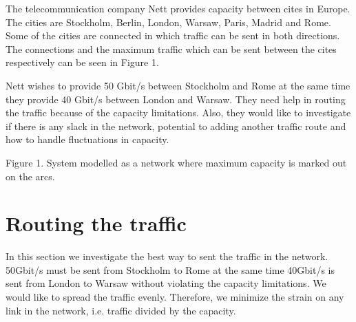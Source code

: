\newpage

The telecommunication company Nett provides capacity between cites in Europe. The cities are Stockholm, Berlin, London, Warsaw, Paris, Madrid and Rome. Some of the cities are connected in which traffic can be sent in both directions. The connections and the maximum traffic which can be sent between the cites respectively can be seen in Figure 1.

Nett wishes to provide 50 Gbit/s between Stockholm and Rome at the same time they provide 40 Gbit/s between London and Warsaw. They need help in routing the traffic because of the capacity limitations. Also, they would like to investigate if there is any slack in the network, potential to adding another traffic route and how to handle fluctuations in capacity.

\begin{center}
\end{center}
Figure 1. System modelled as a network where maximum capacity is marked out on the arcs.

\newpage

\section{Routing the traffic}
In this section we investigate the best way to sent the traffic in the network. 50Gbit/s must be sent from Stockholm to Rome at the same time 40Gbit/s is sent from London to Warsaw without violating the capacity limitations. We would like to spread the traffic evenly. Therefore, we minimize the strain on any link in the network, i.e. traffic divided by the capacity.

